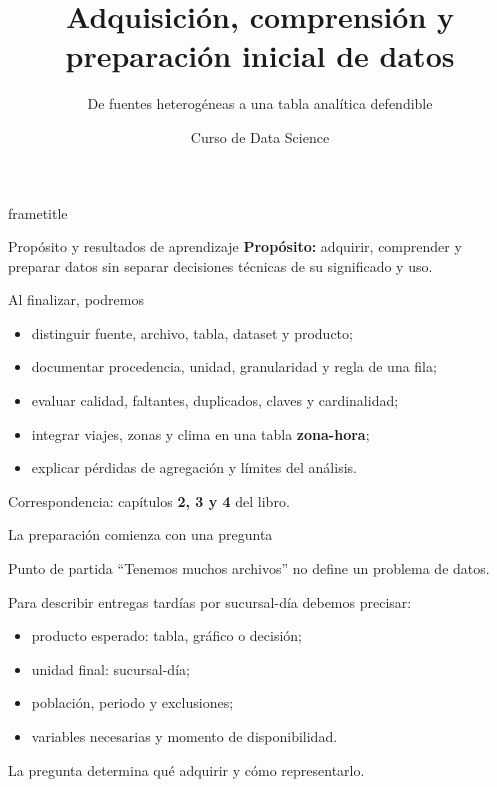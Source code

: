 \documentclass[aspectratio=169,11pt]{beamer}
\title[Data Science · Clase 2]{Adquisición, comprensión y preparación inicial de datos}
\subtitle{De fuentes heterogéneas a una tabla analítica defendible}
\author{Curso de Data Science}
\institute{Semana 2 · Clase 2}
\date{}
\begin{document}
\begin{frame}[plain]
  \begin{beamercolorbox}[wd=\paperwidth,ht=\paperheight,sep=2em]{frametitle}
    \vfill
    {\Huge\inserttitle\par}
    \vspace{0.5em}
    {\Large\insertsubtitle\par}
    \vspace{2em}
    {\color{white}\large\insertauthor\par}
    {\color{white}\insertinstitute\par}
    \vfill
  \end{beamercolorbox}
\end{frame}

\begin{frame}{Propósito y resultados de aprendizaje}
  \small
  \textbf{Propósito:} adquirir, comprender y preparar datos sin separar decisiones técnicas de su significado y uso.
  \begin{block}{Al finalizar, podremos}
    \begin{itemize}
      \item distinguir fuente, archivo, tabla, dataset y producto;
      \item documentar procedencia, unidad, granularidad y regla de una fila;
      \item evaluar calidad, faltantes, duplicados, claves y cardinalidad;
      \item integrar viajes, zonas y clima en una tabla \textbf{zona-hora};
      \item explicar pérdidas de agregación y límites del análisis.
    \end{itemize}
  \end{block}
  \centering Correspondencia: capítulos \textbf{2, 3 y 4} del libro.
\end{frame}

\begin{frame}{La preparación comienza con una pregunta}
  \begin{alertblock}{Punto de partida}
    ``Tenemos muchos archivos'' no define un problema de datos.
  \end{alertblock}
  Para describir entregas tardías por sucursal-día debemos precisar:
  \begin{itemize}
    \item producto esperado: tabla, gráfico o decisión;
    \item unidad final: sucursal-día;
    \item población, periodo y exclusiones;
    \item variables necesarias y momento de disponibilidad.
  \end{itemize}
  \centering\alert{La pregunta determina qué adquirir y cómo representarlo.}
\end{frame}
\end{document}
